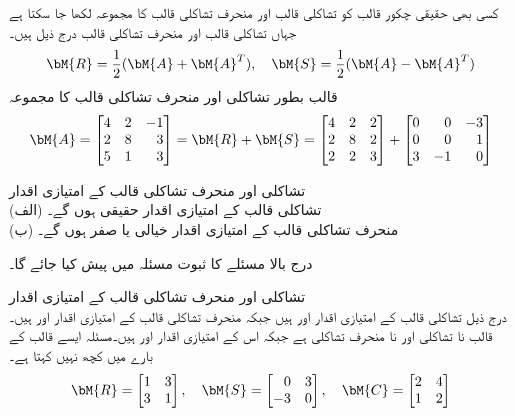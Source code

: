 کسی بھی حقیقی چکور قالب کو تشاکلی قالب  اور منحرف تشاکلی قالب  کا مجموعہ لکھا جا سکتا ہے جہاں تشاکلی قالب اور منحرف تشاکلی قالب درج ذیل ہیں۔
\begin{align}
\bM{R}=\frac{1}{2}(\bM{A}+\bM{A}^T),\quad \bM{S}=\frac{1}{2}(\bM{A}-\bM{A}^T)
\end{align}
\quad قالب بطور تشاکلی اور منحرف تشاکلی قالب کا مجموعہ\\
\begin{align*}
\bM{A}=\begin{bmatrix*}[r] 4&2&-1\\2&8&3\\5&1&3 \end{bmatrix*}=\bM{R}+\bM{S}=\begin{bmatrix*}[r]4&2&2\\2&8&2\\2&2&3  \end{bmatrix*}+\begin{bmatrix*}[r] 0&0&-3\\0&0&1\\3&-1&0  \end{bmatrix*}
\end{align*}

\quad تشاکلی اور منحرف تشاکلی قالب کے امتیازی اقدار\\
(الف) تشاکلی قالب کے امتیازی اقدار حقیقی ہوں گے۔\\
(ب) منحرف تشاکلی قالب کے امتیازی اقدار خیالی یا صفر ہوں گے۔ 

درج بالا مسئلے کا ثبوت مسئلہ  میں پیش کیا جائے گا۔

\quad تشاکلی اور منحرف تشاکلی قالب کے امتیازی اقدار\\
درج ذیل تشاکلی قالب  کے امتیازی اقدار  اور  ہیں جبکہ منحرف تشاکلی قالب  کے امتیازی اقدار  اور  ہیں۔قالب  نا تشاکلی اور نا منحرف تشاکلی ہے جبکہ اس کے امتیازی اقدار  اور  ہیں۔مسئلہ  ایسے قالب کے بارے میں کچھ نہیں کہتا ہے۔
\begin{align*}
\bM{R}=\begin{bmatrix*}[r]1&3\\3&1  \end{bmatrix*}, \quad\bM{S}=\begin{bmatrix*}[r] 0&3\\-3&0\end{bmatrix*},\quad \bM{C}=\begin{bmatrix}2&4\\1&2  \end{bmatrix}
\end{align*}

